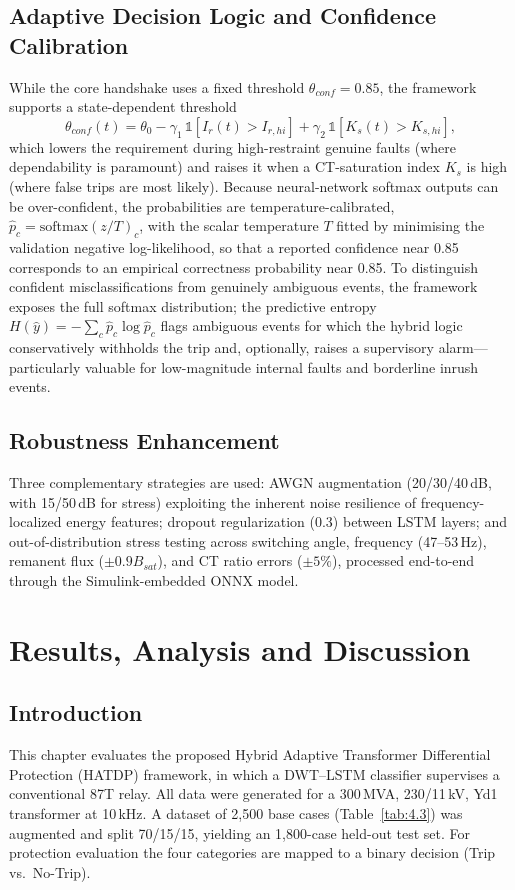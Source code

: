 \documentclass[12pt,a4paper,oneside]{report}
\begin{document}
\section{Adaptive Decision Logic and Confidence Calibration}
While the core handshake uses a fixed threshold $\theta_{conf}=0.85$, the framework supports a state-dependent threshold
\begin{equation}
\theta_{conf}(t)=\theta_0-\gamma_1\,\mathbb{1}[I_r(t)>I_{r,hi}]+\gamma_2\,\mathbb{1}[K_s(t)>K_{s,hi}],
\end{equation}
which lowers the requirement during high-restraint genuine faults (where dependability is paramount) and raises it when a CT-saturation index $K_s$ is high (where false trips are most likely). Because neural-network softmax outputs can be over-confident, the probabilities are temperature-calibrated, $\hat{p}_c=\mathrm{softmax}(z/T)_c$, with the scalar temperature $T$ fitted by minimising the validation negative log-likelihood, so that a reported confidence near 0.85 corresponds to an empirical correctness probability near 0.85. To distinguish confident misclassifications from genuinely ambiguous events, the framework exposes the full softmax distribution; the predictive entropy $H(\hat{y})=-\sum_c\hat{p}_c\log\hat{p}_c$ flags ambiguous events for which the hybrid logic conservatively withholds the trip and, optionally, raises a supervisory alarm---particularly valuable for low-magnitude internal faults and borderline inrush events.

\section{Robustness Enhancement}
Three complementary strategies are used: AWGN augmentation (20/30/40\,dB, with 15/50\,dB for stress) exploiting the inherent noise resilience of frequency-localized energy features; dropout regularization (0.3) between LSTM layers; and out-of-distribution stress testing across switching angle, frequency (47--53\,Hz), remanent flux ($\pm0.9 B_{sat}$), and CT ratio errors ($\pm5\%$), processed end-to-end through the Simulink-embedded ONNX model.

\chapter{Results, Analysis and Discussion}
\section{Introduction}
This chapter evaluates the proposed Hybrid Adaptive Transformer Differential Protection (HATDP) framework, in which a DWT--LSTM classifier supervises a conventional 87T relay. All data were generated for a 300\,MVA, 230/11\,kV, Yd1 transformer at 10\,kHz. A dataset of 2{,}500 base cases (Table~\ref{tab:4.3}) was augmented and split 70/15/15, yielding an 1{,}800-case held-out test set. For protection evaluation the four categories are mapped to a binary decision (Trip vs.\ No-Trip).
\end{document}
